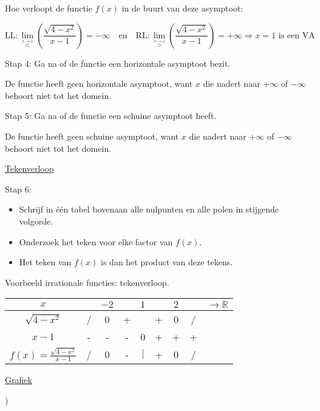 \begin{voorbeeld}
Hoe verloopt de functie $f(x)$ in de buurt van deze asymptoot:

\begin{equation*}
\textrm{LL}:\lim_{\overset{x\rightarrow1}{<}}\left(\frac{\sqrt{4-x^{2}}}{x-1}\right)=-\infty\quad\textrm{en}\quad \textrm{RL}:\lim_{\overset{x\rightarrow1}{>}}\left(\frac{\sqrt{4-x^{2}}}{x-1}\right)=+\infty \Rightarrow x=1 \text{ is een VA}
\end{equation*}


Stap 4: Ga na of de functie een horizontale asymptoot bezit.

De functie heeft geen horizontale asymptoot, want $x$ die nadert
naar $+\infty$ of $-\infty$ behoort niet tot het domein.

Stap 5: Ga na of de functie een schuine asymptoot heeft.

De functie heeft geen schuine asymptoot, want $x$ die nadert naar
$+\infty$ of $-\infty$ behoort niet tot het domein.

\underline{Tekenverloop}

Stap 6:
\begin{itemize}
\item Schrijf in \'e\'en tabel bovenaan alle nulpunten en alle polen
	in stijgende volgorde. 
\item Onderzoek het teken voor elke factor van $f(x)$. 
\item Het teken van $f(x)$ is dan het product van deze tekens.
\end{itemize}


\begin{tabel}{Voorbeeld irrationale functies: tekenverloop.}
\begin{tabular}{c|cccccccc}
$x$ &  & $-2$ &  & $1$ &  & $2$ &  & $\longrightarrow\mathbb{R}$\\
\hline  
$\sqrt{4-x^{2}}$ & / & 0 & + &  & + & 0 & / & \\
$x-1$ & - & - & - & 0 & + & + & + & \\
\hline 
$f(x)=\frac{\sqrt{4-x^{2}}}{x-1}$ & / & 0 & - & $\mid$ & + & 0 & / & \\
\end{tabular}
\label{tab:irrattk}
\end{tabel}

\underline{Grafiek}


\begin{figure}[H]
		
\end{figure})


\end{voorbeeld}


